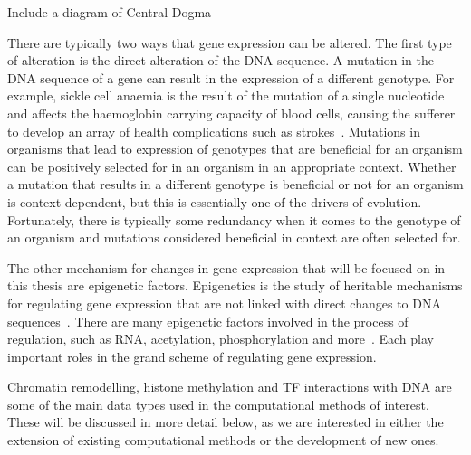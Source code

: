         \begin{center}
            Include a diagram of Central Dogma
        \end{center}
        
        There are typically two ways that gene expression can be altered.
        The first type of alteration is the direct alteration of the DNA sequence. A mutation in the DNA sequence of a gene can result in the expression of a different genotype.        %
        For example, sickle cell anaemia is the result of the mutation of a single nucleotide and affects the haemoglobin carrying capacity of blood cells, causing the sufferer to develop an array of health complications such as strokes~\cite{clancy2008dna}. 
        Mutations in organisms that lead to expression of genotypes that are beneficial for an organism can be positively selected for in an organism in an appropriate context. Whether a mutation that results in a different genotype is beneficial or not for an organism is context dependent, but this is essentially one of the drivers of evolution. Fortunately, there is typically some redundancy when it comes to the genotype of an organism and mutations considered beneficial in context are often selected for.
        
        The other mechanism for changes in gene expression that will be focused on in this thesis are epigenetic factors. Epigenetics is the study of heritable mechanisms for regulating gene expression that are not linked with direct changes to DNA sequences~\cite{holliday2006epigenetics}. There are many epigenetic factors involved in the process of regulation, such as RNA, acetylation, phosphorylation and more~\cite{geiman2002chromatin, jaenisch2003epigenetic, holoch2015rna, waterland2003transposable}. Each play important roles in the grand scheme of regulating gene expression. 
        
        Chromatin remodelling, histone methylation and TF interactions with DNA are some of the main data types used in the computational methods of interest. These will be discussed in more detail below, as we are interested in either the extension of existing computational methods or the development of new ones. 
        
